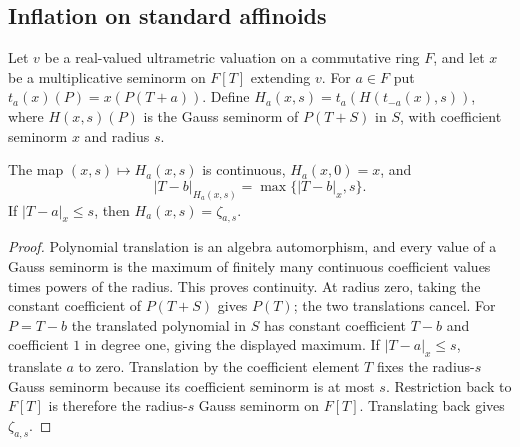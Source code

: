 \subsection{Inflation on standard affinoids}\label{subsec:fc-line-inflation}

\begin{definition}\label{def:fc-centered-inflation}
\leanok
Let $v$ be a real-valued ultrametric valuation on a commutative ring $F$, and
let $x$ be a multiplicative seminorm on $F[T]$ extending $v$.
For $a\in F$ put $t_a(x)(P)=x(P(T+a))$. Define
$H_a(x,s)=t_a(H(t_{-a}(x),s))$, where
$H(x,s)(P)$ is the Gauss seminorm of $P(T+S)$ in $S$, with coefficient
seminorm $x$ and radius $s$.
\end{definition}

\begin{lemma}\label{lem:fc-inflation-linear}
\leanok
The map $(x,s)\mapsto H_a(x,s)$ is continuous, $H_a(x,0)=x$, and
\[
 |T-b|_{H_a(x,s)}=\max\{|T-b|_x,s\}.
\]
If $|T-a|_x\le s$, then $H_a(x,s)=\zeta_{a,s}$.
\end{lemma}

\begin{proof}
Polynomial translation is an algebra automorphism, and every value of a Gauss
seminorm is the maximum of finitely many continuous coefficient values times
powers of the radius. This proves continuity. At radius zero, taking the
constant coefficient of $P(T+S)$ gives $P(T)$; the two translations cancel.
For $P=T-b$ the translated polynomial in $S$ has constant coefficient $T-b$
and coefficient $1$ in degree one, giving the displayed maximum.
If $|T-a|_x\le s$, translate $a$ to zero. Translation by the coefficient
element $T$ fixes the radius-$s$ Gauss seminorm because its coefficient
seminorm is at most $s$. Restriction back to $F[T]$ is therefore the
radius-$s$ Gauss seminorm on $F[T]$. Translating back gives $\zeta_{a,s}$.
\end{proof}

